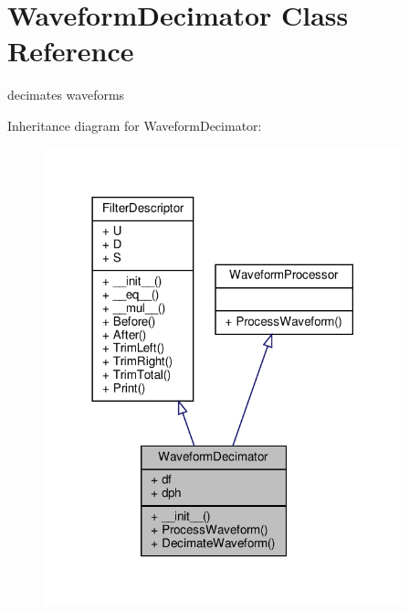 \hypertarget{classSignalIntegrity_1_1TimeDomain_1_1Filters_1_1WaveformDecimator_1_1WaveformDecimator}{}\section{Waveform\+Decimator Class Reference}
\label{classSignalIntegrity_1_1TimeDomain_1_1Filters_1_1WaveformDecimator_1_1WaveformDecimator}


decimates waveforms  




Inheritance diagram for Waveform\+Decimator\+:\nopagebreak
\begin{figure}[H]
\begin{center}
\leavevmode
\includegraphics[width=294pt]{classSignalIntegrity_1_1TimeDomain_1_1Filters_1_1WaveformDecimator_1_1WaveformDecimator__inherit__graph}
\end{center}
\end{figure}


